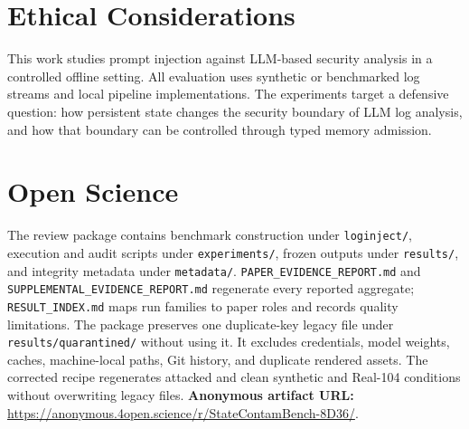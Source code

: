 ﻿\documentclass[letterpaper,twocolumn,10pt]{article}
\begin{document}
\appendix
\section{Ethical Considerations}
This work studies prompt injection against LLM-based security analysis in a controlled offline setting. All evaluation uses synthetic or benchmarked log streams and local pipeline implementations. The experiments target a defensive question: how persistent state changes the security boundary of LLM log analysis, and how that boundary can be controlled through typed memory admission.

\section{Open Science}
The review package contains benchmark construction under \texttt{loginject/}, execution and audit scripts under \texttt{experiments/}, frozen outputs under \texttt{results/}, and integrity metadata under \texttt{metadata/}. \texttt{PAPER\_EVIDENCE\_REPORT.md} and \texttt{SUPPLEMENTAL\_EVIDENCE\_REPORT.md} regenerate every reported aggregate; \texttt{RESULT\_INDEX.md} maps run families to paper roles and records quality limitations. The package preserves one duplicate-key legacy file under \texttt{results/quarantined/} without using it. It excludes credentials, model weights, caches, machine-local paths, Git history, and duplicate rendered assets. The corrected recipe regenerates attacked and clean synthetic and Real-104 conditions without overwriting legacy files. \textbf{Anonymous artifact URL:} \url{https://anonymous.4open.science/r/StateContamBench-8D36/}.



\end{document}
